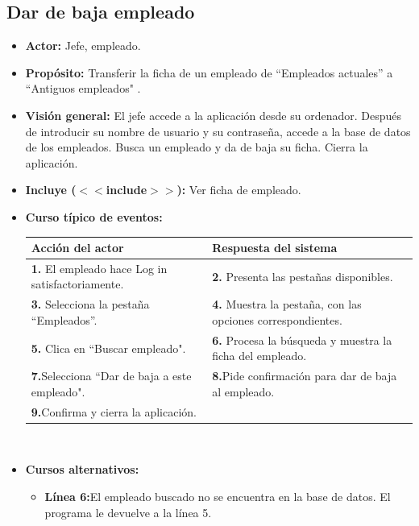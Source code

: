 \documentclass[spanish,a4paper,11pt, twoside]{report}	%
\begin{document}

	\subsection{Dar de baja empleado}	
			\begin{itemize}
			\item \textbf{Actor:} Jefe, empleado.
			\item \textbf{Propósito:} Transferir la ficha de un empleado de “Empleados actuales” a “Antiguos empleados" .
			\item \textbf{Visión general:} El jefe accede a la aplicación desde su ordenador. Después de introducir su nombre de usuario y su contraseña, accede a la base de datos de los empleados. Busca un empleado y da de baja su ficha. Cierra la aplicación. 
			\item \textbf{Incluye ($<<$include$>>$):} Ver ficha de empleado.
			\item \textbf{Curso típico de eventos:} 	\\
				\begin{tabular}{|p{6cm}||p{6cm}|}
				\hline
				\textbf{Acción del actor} & \textbf{Respuesta del sistema} \\ \hline \hline
				\textbf{1.}   El empleado hace Log in satisfactoriamente. & \textbf{2.} Presenta las pestañas disponibles.\\ \hline
				\textbf{3.} Selecciona la pestaña “Empleados”. & \textbf{4.} Muestra la pestaña, con las opciones correspondientes. \\ \hline
				\textbf{5.} Clica en “Buscar empleado".	& \textbf{6.} Procesa la búsqueda y muestra la ficha del empleado. \\ \hline
				\textbf{7.}Selecciona “Dar de baja a este empleado". & \textbf{8.}Pide confirmación para dar de baja al empleado.\\ \hline
				\textbf{9.}Confirma y cierra la aplicación. & \textbf{} \\ \hline
			\end{tabular}
			\\
			\item \textbf{Cursos alternativos:} 
			\begin{itemize}
			\item  \textbf{Línea 6:}El empleado buscado no se encuentra en la base de datos. El programa le devuelve a la línea 5.
			\end {itemize}
		\end{itemize}
\end{document}
